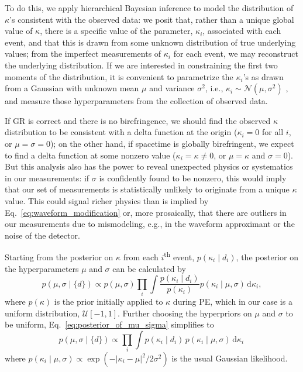 \documentclass[aps,prd,twocolumn,superscriptaddress,preprintnumbers,nofootinbib]{revtex4-2}
\newcommand{\infd}{\mathrm{d}}
\begin{document}
To do this, we apply hierarchical Bayesian inference \cite{Mandel2010,Hogg2010} to model the distribution of $\kappa$'s consistent with the observed data:
we posit that, rather than a unique global value of $\kappa$, there is a specific value of the parameter, $\kappa_i$, associated with each event, and that this is drawn from some unknown distribution of true underlying values; from the imperfect measurements of $\kappa_i$ for each event, we may reconstruct the underlying distribution.
If we are interested in constraining the first two moments of the distribution, it is convenient to parametrize the $\kappa_i$'s as drawn from a Gaussian with unknown mean $\mu$ and variance $\sigma^2$, i.e., $\kappa_i \sim \mathcal{N}(\mu, \sigma^2)$ \cite{Isi:2019asy}, and measure those hyperparameters from the collection of observed data.

If \ac{GR} is correct and there is no birefringence, we should find the observed $\kappa$ distribution to be consistent with a delta function at the origin ($\kappa_i = 0$ for all $i$, or $\mu=\sigma=0$); on the other hand, if spacetime is globally birefringent, we expect to find a delta function at some nonzero value ($\kappa_i = \kappa \neq 0$, or $\mu = \kappa$ and $\sigma=0$).
But this analysis also has the power to reveal unexpected physics or systematics in our measurements: if $\sigma$ is confidently found to be nonzero, this would imply that our set of measurements is statistically unlikely to originate from a unique $\kappa$ value.
This could signal richer physics than is implied by Eq.~\eqref{eq:waveform_modification} or, more prosaically, that there are outliers in our measurements due to mismodeling, e.g., in the waveform approximant or the noise of the detector.

Starting from the posterior on $\kappa$ from each $i$\textsuperscript{th} event, $p(\kappa_i\mid d_i)$, the posterior on the hyperparameters $\mu$ and $\sigma$ can be calculated by
\begin{equation}
    p(\mu,\sigma \mid \{d\})\propto p(\mu,\sigma)\prod_{i}\int\frac{p(\kappa_i\mid d_i)}{p(\kappa_i)}p(\kappa_i\mid\mu,\sigma)\,\infd\kappa_i,
    \label{eq:posterior_of_mu_sigma}
\end{equation}
where $p(\kappa)$ is the prior initially applied to $\kappa$ during \ac{PE}, which in our case is a uniform distribution, $\mathcal{U}[-1,1]$.
Further choosing the hyperpriors on $\mu$ and $\sigma$ to be uniform, Eq.~\eqref{eq:posterior_of_mu_sigma} simplifies to
\begin{equation}
    p(\mu,\sigma\mid\{d\})\propto\prod_{i}\int p(\kappa_i\mid d_i)\, p(\kappa_i\mid\mu,\sigma)\,\infd\kappa_i\,
\end{equation}
where $p(\kappa_i\mid\mu,\sigma) \propto \exp(-|\kappa_i - \mu|^2/2\sigma^2)$ is the usual Gaussian likelihood.
\end{document}
